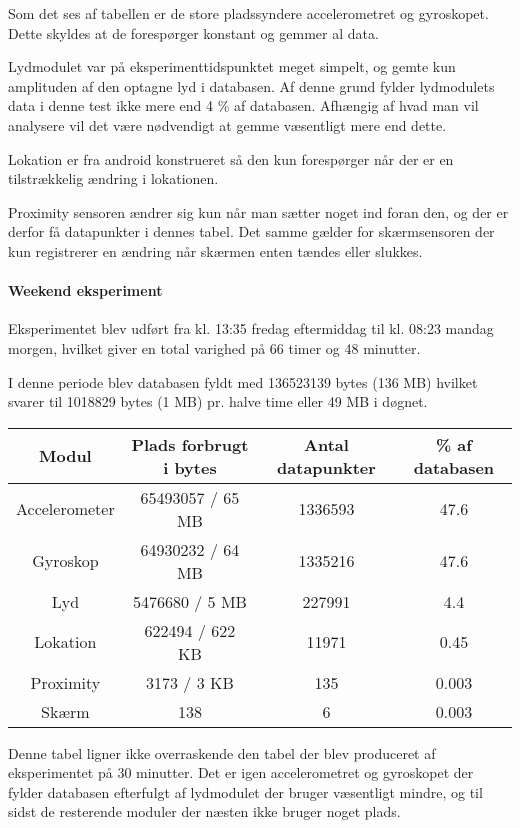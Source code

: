 Som det ses af tabellen er de store pladssyndere accelerometret og gyroskopet.
Dette skyldes at de forespørger konstant og gemmer al data.

Lydmodulet var på eksperimenttidspunktet meget simpelt, og gemte kun amplituden af den optagne lyd i databasen. 
Af denne grund fylder lydmodulets data i denne test ikke mere end 4 \% af databasen.
Afhængig af hvad man vil analysere vil det være nødvendigt at gemme væsentligt mere end dette.

Lokation er fra android konstrueret så den kun forespørger når der er en tilstrækkelig ændring i lokationen.

Proximity sensoren ændrer sig kun når man sætter noget ind foran den, og der er derfor få datapunkter i dennes tabel.
Det samme gælder for skærmsensoren der kun registrerer en ændring når skærmen enten tændes eller slukkes.	

\paragraph{Weekend eksperiment}

Eksperimentet blev udført fra kl. 13:35 fredag eftermiddag til kl. 08:23 mandag morgen, hvilket giver en total varighed på 66 timer og 48 minutter.

I denne periode blev databasen fyldt med 136523139 bytes (136 MB) hvilket svarer til 1018829 bytes (1 MB) pr. halve time eller 49 MB i døgnet.

\begin{tabular}{|c|c|c|c|}
	\hline Modul 		 & Plads forbrugt i bytes	  	& Antal datapunkter & \% af databasen \\
	\hline Accelerometer & 65493057 / 65 MB   			& 1336593    		& 47.6 \\ 
	\hline Gyroskop 	 & 64930232 / 64 MB  			& 1335216   		& 47.6\\ 
	\hline Lyd 		  	 & 5476680  / 5  MB  			& 227991     		& 4.4 \\ 
	\hline Lokation 	 & 622494 	/ 622 KB			& 11971      		& 0.45 \\ 
	\hline Proximity 	 & 3173 	/ 3 KB				& 135 				& 0.003 \\ 
	\hline Skærm 		 & 138           				& 6          		& 0.003 \\ 
	\hline 
\end{tabular} 

Denne tabel ligner ikke overraskende den tabel der blev produceret af eksperimentet på 30 minutter.
Det er igen accelerometret og gyroskopet der fylder databasen efterfulgt af lydmodulet der bruger væsentligt mindre, og til sidst de resterende moduler der næsten ikke bruger noget plads.

